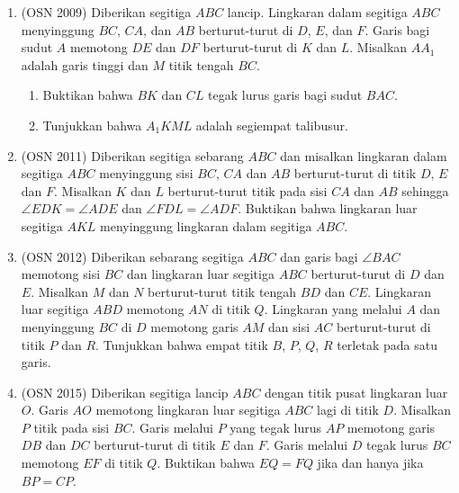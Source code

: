 \documentclass[12pt]{scrartcl}
\begin{document}
\begin{enumerate}
        \item (OSN 2009) Diberikan segitiga $ABC$ lancip. Lingkaran dalam segitiga $ABC$ menyinggung $BC$, $CA$, dan $AB$ berturut-turut di $D$, $E$, dan $F$. Garis bagi sudut $A$ memotong $DE$ dan $DF$ berturut-turut di $K$ dan $L$. Misalkan $AA_1$ adalah garis tinggi dan $M$ titik tengah $BC$.
        \begin{enumerate}
        \item[(a)] Buktikan bahwa $BK$ dan $CL$ tegak lurus garis bagi sudut $BAC$.
        \item[(b)] Tunjukkan bahwa $A_1KML$ adalah segiempat talibusur.
        \end{enumerate}
        
        \item (OSN 2011) Diberikan segitiga sebarang $ABC$ dan misalkan lingkaran dalam segitiga $ABC$ menyinggung sisi $BC$, $CA$ dan $AB$ berturut-turut di titik $D$, $E$ dan $F$. Misalkan $K$ dan $L$ berturut-turut titik pada sisi $CA$ dan $AB$ sehingga $\angle EDK = \angle ADE$ dan $\angle FDL = \angle ADF$. Buktikan bahwa lingkaran luar segitiga $AKL$ menyinggung lingkaran dalam segitiga $ABC$.
        
        \item (OSN 2012) Diberikan sebarang segitiga $ABC$ dan garis bagi $\angle BAC$ memotong sisi $BC$ dan lingkaran luar segitiga $ABC$ berturut-turut di $D$ dan $E$. Misalkan $M$ dan $N$ berturut-turut titik tengah $BD$ dan $CE$. Lingkaran luar segitiga $ABD$ memotong $AN$ di titik $Q$. Lingkaran yang melalui $A$ dan menyinggung $BC$ di $D$ memotong garis $AM$ dan sisi $AC$ berturut-turut di titik $P$ dan $R$. Tunjukkan bahwa empat titik $B$, $P$, $Q$, $R$ terletak pada satu garis.
        
        \item (OSN 2015) Diberikan segitiga lancip $ABC$ dengan titik pusat lingkaran luar $O$. Garis $AO$ memotong lingkaran luar segitiga $ABC$ lagi di titik $D$. Misalkan $P$ titik pada sisi $BC$. Garis melalui $P$ yang tegak lurus $AP$ memotong garis $DB$ dan $DC$ berturut-turut di titik $E$ dan $F$. Garis melalui $D$ tegak lurus $BC$ memotong $EF$ di titik $Q$. Buktikan bahwa $EQ = FQ$ jika dan hanya jika $BP = CP$.
    \end{enumerate}
\end{document}

